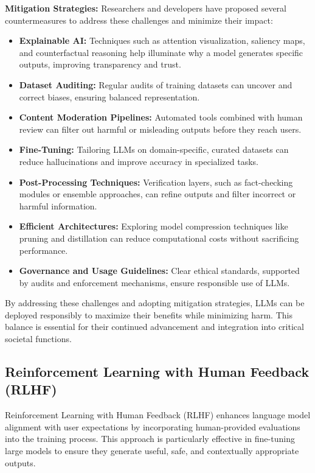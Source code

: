     \textbf{Mitigation Strategies:}
    Researchers and developers have proposed several countermeasures to address these challenges and minimize their impact:
    \begin{itemize}
        \item \textbf{Explainable AI:} Techniques such as attention visualization, saliency maps, and counterfactual reasoning help illuminate why a model generates specific outputs, improving transparency and trust.
        \item \textbf{Dataset Auditing:} Regular audits of training datasets can uncover and correct biases, ensuring balanced representation.
        \item \textbf{Content Moderation Pipelines:} Automated tools combined with human review can filter out harmful or misleading outputs before they reach users.
        \item \textbf{Fine-Tuning:} Tailoring LLMs on domain-specific, curated datasets can reduce hallucinations and improve accuracy in specialized tasks.
        \item \textbf{Post-Processing Techniques:} Verification layers, such as fact-checking modules or ensemble approaches, can refine outputs and filter incorrect or harmful information.
        \item \textbf{Efficient Architectures:} Exploring model compression techniques like pruning and distillation can reduce computational costs without sacrificing performance.
        \item \textbf{Governance and Usage Guidelines:} Clear ethical standards, supported by audits and enforcement mechanisms, ensure responsible use of LLMs.
    \end{itemize}

    By addressing these challenges and adopting mitigation strategies, LLMs can be deployed responsibly to maximize their benefits while minimizing harm. This balance is essential for their continued advancement and integration into critical societal functions.



\subsection{Reinforcement Learning with Human Feedback (RLHF)}

\large Reinforcement Learning with Human Feedback (RLHF) enhances language model alignment with user expectations by incorporating human-provided evaluations into the training process. This approach is particularly effective in fine-tuning large models to ensure they generate useful, safe, and contextually appropriate outputs.

